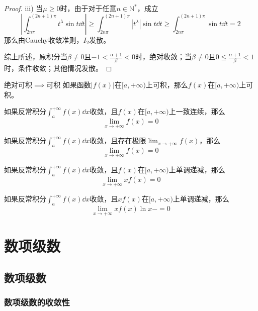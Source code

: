 \documentclass[lang = cn, scheme = chinese, thmcnt = section]{elegantbook}
\newcommand{\N}{\mathbb{N}}            %
\begin{document}
\begin{proof}
	iii) 当$\mu\ge 0$时，由于对于任意$n\in\N^*$，成立
	$$
	\left| \int_{2n\pi}^{(2n+1)\pi}t^\lambda\sin t\dd t \right|
	\ge \int_{2n\pi}^{(2n+1)\pi}|t^\lambda|\sin t\dd t
	\ge \int_{2n\pi}^{(2n+1)\pi}\sin t\dd t
	= 2
	$$
	那么由Cauchy收敛准则，$I_2$发散。
	
	综上所述，原积分当$\beta\ne0$且$-1<\frac{\alpha+1}{\beta}<0$时，绝对收敛；当$\beta\ne0$且$0\le \frac{\alpha+1}{\beta}<1$时，条件收敛；其他情况发散。
\end{proof}

\begin{theorem}{绝对可积$\implies$可积}
	如果函数$|f(x)|$在$[a,+\infty)$上可积，那么$f(x)$在$[a,+\infty)$上可积。
\end{theorem}

\begin{theorem}
	如果反常积分$\displaystyle \int_a^{+\infty}f(x)\dd x$收敛，且$f(x)$在$[a,+\infty)$上一致连续，那么
	$$
	\lim_{x\to +\infty}f(x)=0
	$$
\end{theorem}

\begin{theorem}
	如果反常积分$\displaystyle \int_a^{+\infty}f(x)\dd x$收敛，且存在极限$\displaystyle \lim_{x\to +\infty}f(x)$，那么
	$$
	\lim_{x\to +\infty}f(x)=0
	$$
\end{theorem}

\begin{theorem}
	如果反常积分$\displaystyle \int_a^{+\infty}f(x)\dd x$收敛，且$f(x)$在$[a,+\infty)$上单调递减，那么
	$$
	\lim_{x\to +\infty}xf(x)=0
	$$
\end{theorem}

\begin{theorem}
	如果反常积分$\displaystyle \int_a^{+\infty}f(x)\dd x$收敛，且$xf(x)$在$[a,+\infty)$上单调递减，那么
	$$
	\lim_{x\to +\infty}xf(x)\ln x-=0
	$$
\end{theorem}

\chapter{数项级数}

\section{数项级数}

\subsection{数项级数的收敛性}
\end{document}
